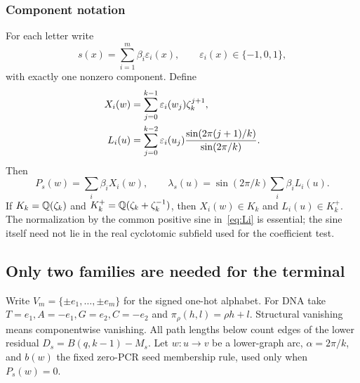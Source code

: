 \subsubsection{Component notation}

For each letter write
\[
  s(x)=\sum_{i=1}^m \beta_i\varepsilon_i(x),
  \qquad \varepsilon_i(x)\in\{-1,0,1\},
\]
with exactly one nonzero component.  Define
\begin{align}
  X_i(w)&=\sum_{j=0}^{k-1}\varepsilon_i(w_j)\zeta_k^{j+1},                 \label{eq:Xi}\\
  L_i(u)&=\sum_{j=0}^{k-2}\varepsilon_i(u_j)
    \frac{\sin(2\pi(j+1)/k)}{\sin(2\pi/k)}.                             \label{eq:Li}
\end{align}
Then
\begin{equation}
  P_s(w)=\sum_i\beta_iX_i(w),\qquad
  \lambda_s(u)=\sin(2\pi/k)\sum_i\beta_iL_i(u).                         \label{eq:component-decomp}
\end{equation}
If $K_k=\mathbb Q(\zeta_k)$ and $K_k^+=\mathbb Q(\zeta_k+\zeta_k^{-1})$, then
$X_i(w)\in K_k$ and $L_i(u)\in K_k^+$.  The normalization by the common
positive sine in~\eqref{eq:Li} is essential; the sine itself need not lie in
the real cyclotomic subfield used for the coefficient test.

\subsection{Only two families are needed for the terminal}\label{ext:sec:two}
Write $V_m=\{\pm e_1,\ldots,\pm e_m\}$ for the signed one-hot
alphabet. For DNA take $T=e_1,A=-e_1,G=e_2,C=-e_2$ and
$\pi_\rho(h,l)=\rho h+l$. Structural vanishing means componentwise
vanishing. All path lengths below count edges of the lower residual
$D_s=B(q,k-1)-M_s$.
Let $w:u\to v$ be a lower-graph arc, $\alpha=2\pi/k$, and $b(w)$ the fixed zero-PCR seed membership rule, used only when $P_s(w)=0$.

